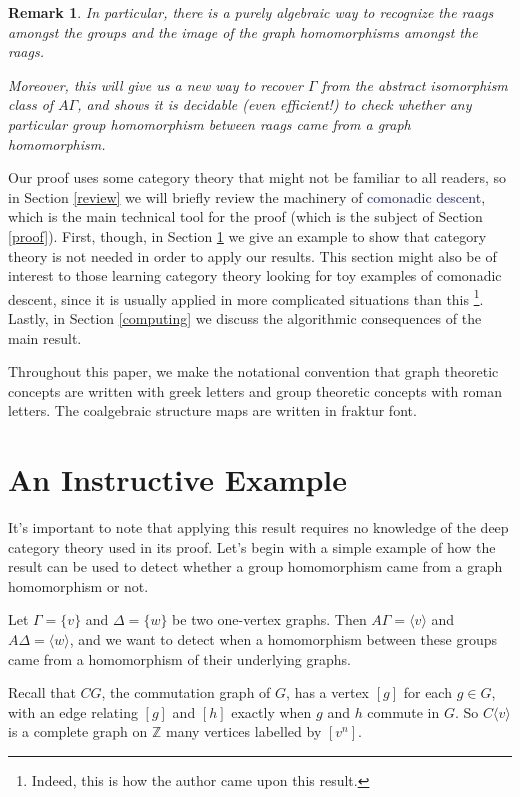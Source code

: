 \documentclass[12pt]{article}
\newtheorem*{rmk}{Remark}
\theoremstyle{definition}
\theoremstyle{theorem}
\newcommand*{\important}[1]{\textcolor{MidnightBlue}{#1}}
\begin{document}
  \begin{rmk}
    In particular, there is a purely algebraic way to recognize the 
    raags amongst the groups and the image of the graph homomorphisms 
    amongst the raags.

    Moreover, this will give us a new way to recover $\Gamma$ from the 
    abstract isomorphism class of $A \Gamma$, and shows it is 
    decidable (even efficient!) to check whether any particular
    group homomorphism between raags came from a graph homomorphism.
  \end{rmk}

  Our proof uses some category theory that might not be familiar to all
  readers, so in Section \ref{review} we will briefly review the machinery 
  of \important{comonadic descent}, which is the main technical tool for 
  the proof (which is the subject of Section \ref{proof}). 
  First, though, in Section \ref{eg} we give an example to show that 
  category theory is not needed in order to apply our results.
  This section might also be of interest to 
  those learning category theory looking for toy examples of comonadic descent, 
  since it is usually applied in more complicated situations than this%
  \footnote{Indeed, this is how the author came upon this result.}. 
  Lastly, in Section \ref{computing} we discuss the algorithmic consequences 
  of the main result.

  Throughout this paper, we make the notational convention that graph theoretic 
  concepts are written with greek letters and group theoretic concepts with 
  roman letters. The coalgebraic structure maps are written in fraktur font.

\section{An Instructive Example}
\label{eg}

It's important to note that applying this result requires no knowledge of 
the deep category theory used in its proof. Let's begin with a simple example
of how the result can be used to detect whether a group 
homomorphism came from a graph homomorphism or not.

Let $\Gamma = \{ v \}$ and $\Delta = \{ w \}$ be two one-vertex graphs.
Then $A \Gamma = \langle v \rangle$ and $A \Delta = \langle w \rangle$,
and we want to detect when a homomorphism between these groups came from a
homomorphism of their underlying graphs.

Recall that $CG$, the commutation graph of $G$, has a vertex $[g]$ for 
each $g \in G$, with an edge relating $[g]$ and $[h]$ exactly when 
$g$ and $h$ commute in $G$. So $C \langle v \rangle$ is a complete 
graph on $\mathbb{Z}$ many vertices labelled by $[v^n]$.
\end{document}
